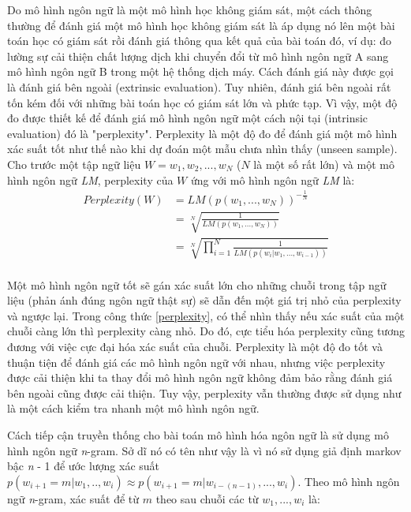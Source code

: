 Do mô hình ngôn ngữ là một mô hình học không giám sát, một cách thông thường để đánh giá một mô hình học không giám sát là áp dụng nó lên một bài toán học có giám sát rồi đánh giá thông qua kết quả của bài toán đó, ví dụ: đo lường sự cải thiện chất lượng dịch khi chuyển đổi từ mô hình ngôn ngữ A sang mô hình ngôn ngữ B trong một hệ thống dịch máy. Cách đánh giá này được gọi là đánh giá bên ngoài (extrinsic evaluation). Tuy nhiên, đánh giá bên ngoài rất tốn kém đối với những bài toán học có giám sát lớn và phức tạp. Vì vậy, một độ đo được thiết kế để đánh giá mô hình ngôn ngữ một cách nội tại (intrinsic evaluation) đó là "perplexity". Perplexity là một độ đo để đánh giá một mô hình xác suất tốt như thế nào khi dự đoán một mẫu chưa nhìn thấy (unseen sample). Cho trước một tập ngữ liệu $ W = w_1, w_2, ..., w_N$ ($N$ là một số rất lớn) và một mô hình ngôn ngữ \textit{LM}, perplexity của $W$ ứng với mô hình ngôn ngữ \textit{LM} là:
\begin{equation} \label{perplexity}
\begin{split}
Perplexity(W) &= LM \left(p(w_1,...,w_N) \right)^{-\frac{1}{N}} \\
			  &= \sqrt[N]{\frac{1}{LM(p(w_1,...,w_N))}} \\
			  &= \sqrt[N]{\prod_{i=1}^{N}  \frac{1}{LM(p(w_i|w_1,...,w_{i-1}))}} \\
\end{split}
\end{equation}

Một mô hình ngôn ngữ tốt sẽ gán xác suất lớn cho những chuỗi trong tập ngữ liệu (phản ánh đúng ngôn ngữ thật sự) sẽ dẫn đến một giá trị nhỏ của perplexity và ngược lại. Trong công thức \ref{perplexity}, có thể nhìn thấy nếu xác suất của một chuỗi càng lớn thì perplexity càng nhỏ. Do đó, cực tiểu hóa perplexity cũng tương đương với việc cực đại hóa xác suất của chuỗi. Perplexity là một độ đo tốt và thuận tiện để đánh giá các mô hình ngôn ngữ với nhau, nhưng việc perplexity được cải thiện khi ta thay đổi mô hình ngôn ngữ không đảm bảo rằng đánh giá bên ngoài cũng được cải thiện. Tuy vậy, perplexity vẫn thường được sử dụng như là một cách kiểm tra nhanh một mô hình ngôn ngữ. 

Cách tiếp cận truyền thống cho bài toán mô hình hóa ngôn ngữ là sử dụng mô hình ngôn ngữ \textit{n}-gram. Sở dĩ nó có tên như vậy là vì nó sử dụng giả định markov bậc \textit{n} - 1 để ước lượng xác suất $p \left(w_{i+1}=m|w_1,..,w_i \right) \approx p \left(w_{i+1}=m|w_{i-(n-1)},...,w_i \right)$. Theo mô hình ngôn ngữ \textit{n}-gram, xác suất để từ $m$ theo sau chuỗi các từ $w_1,...,w_{i}$ là:

